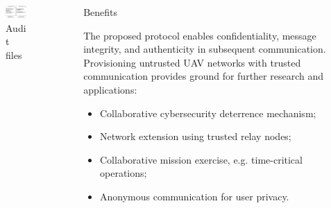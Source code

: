 \documentclass[final]{beamer}
\newlength{\sepwid}
\newlength{\onecolwid}
\newlength{\twocolwid}
\begin{document}
\begin{frame}[t]
\begin{columns}[t]
\begin{column}{\twocolwid}
\begin{columns}[t,totalwidth=\twocolwid]
\begin{column}{\onecolwid}
\begin{figure}
\includegraphics[width=\linewidth]{images/Files.png}
\caption{Audit files}
\vspace{-1cm}
\end{figure}

\end{column} %

\end{columns} %

\end{column} %


\begin{column}{\sepwid}\end{column} %

\begin{column}{\onecolwid} %

\begin{alertblock}{Benefits}

The proposed protocol enables confidentiality, message integrity, and authenticity in subsequent communication. Provisioning untrusted UAV networks with trusted communication provides ground for further research and applications:
\begin{itemize}
\item Collaborative cybersecurity deterrence mechanism;
\item Network extension using trusted relay nodes;
\item Collaborative mission exercise, e.g. time-critical operations;
\item Anonymous communication for user privacy.
\end{itemize}


\end{alertblock}
\end{column}
\end{columns}
\end{frame}
\end{document}
